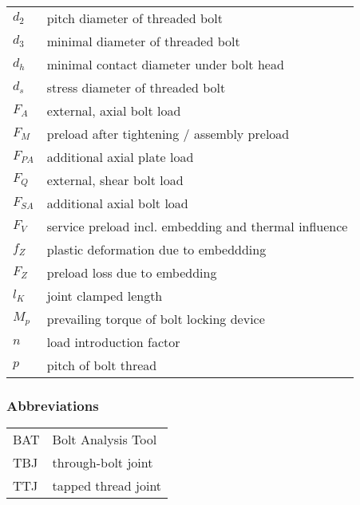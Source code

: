 \begin{longtable}{p{4cm} l}
  $d_2$ & pitch diameter of threaded bolt \\
  $d_3$ & minimal diameter of threaded bolt \\
  $d_h$ & minimal contact diameter under bolt head \\
  $d_s$ & stress diameter of threaded bolt \\
  $F_A$ & external, axial bolt load \\
  $F_M$ & preload after tightening / assembly preload \\
  $F_{PA}$ & additional axial plate load \\
  $F_Q$ & external, shear bolt load \\
  $F_{SA}$ & additional axial bolt load \\
  $F_V$ & service preload incl. embedding and thermal influence \\
  $f_Z$ & plastic deformation due to embeddding \\
  $F_Z$ & preload loss due to embedding \\
  $l_K$ & joint clamped length \\
  $M_p$ & prevailing torque of bolt locking device \\
  $n$ & load introduction factor \\
  $p$ & pitch of bolt thread \\
\end{longtable}

\subsubsection*{Abbreviations}
\begin{tabular}{p{3cm} l}
  BAT & Bolt Analysis Tool \\
  TBJ & through-bolt joint \\
  TTJ & tapped thread joint \\
\end{tabular}